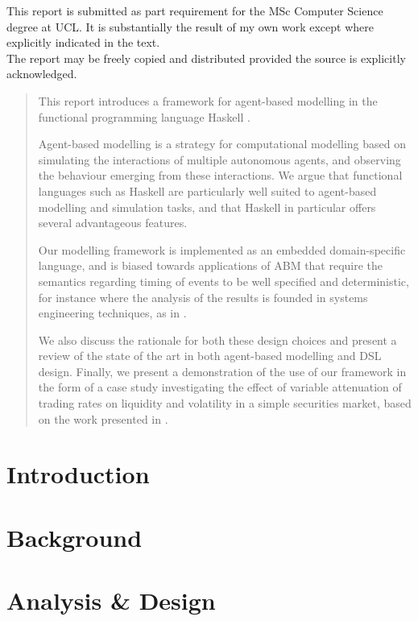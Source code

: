 \documentclass[a4paper, 11pt]{article}
\let\stdsection\section
\renewcommand\section{\newpage\stdsection}
\begin{document}
\maketitle
\begin{center}
\footnotesize This report is submitted as part requirement for the MSc Computer Science
degree at UCL. It is substantially the result of my own work except where explicitly indicated in the text.
\\
\footnotesize The report may be freely copied and distributed provided the source is explicitly acknowledged.
\end{center}

\begin{abstract}
This report introduces a framework for agent-based modelling in the functional programming language Haskell \cite{Jones2003}.

Agent-based modelling \cite{Holland1991} is a strategy for computational modelling based on simulating the interactions of multiple autonomous agents, and observing the behaviour emerging from these interactions. We argue that functional languages such as Haskell are particularly well suited to agent-based modelling and simulation tasks, and that Haskell in particular offers several advantageous features.

Our modelling framework is implemented as an embedded domain-specific language, and is biased towards applications of ABM that require the semantics regarding timing of events to be well specified and deterministic, for instance where the analysis of the results is founded in systems engineering techniques, as in \cite{Clack2011}.

We also discuss the rationale for both these design choices and present a review of the state of the art in both agent-based modelling and DSL design. Finally, we present a demonstration of the use of our framework in the form of a case study investigating the effect of variable attenuation of trading rates on liquidity and volatility in a simple securities market, based on the work presented in \cite{Clack2011}.
\end{abstract}
\tableofcontents
\section{Introduction}
\section{Background}
\section{Analysis \& Design}
\end{document}
